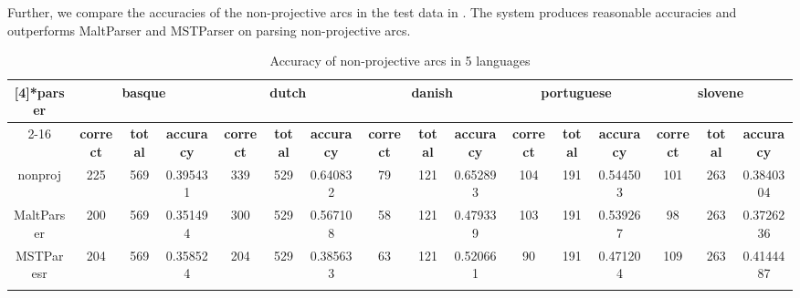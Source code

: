 Further, we compare the accuracies of the
non-projective arcs in the test data in .
The system produces reasonable accuracies and outperforms MaltParser and MSTParser on parsing non-projective arcs.

\begin{table}[th]
\tiny
  \centering
  \caption{Accuracy of non-projective arcs in 5 languages}
    \begin{tabular}{c|ccc|ccc|ccc|ccc|ccc}
    \whline
    \multirow{2}[4]{*}{\textbf{parser}} & \multicolumn{3}{c|}{\textbf{basque}} & \multicolumn{3}{c|}{\textbf{dutch}} & \multicolumn{3}{c|}{\textbf{danish}} & \multicolumn{3}{c|}{\textbf{portuguese}} & \multicolumn{3}{c}{\textbf{slovene}} \\
\cline{2-16}          & \textbf{correct} & \textbf{total} & \textbf{accuracy} & \textbf{correct} & \textbf{total} & \textbf{accuracy} & \textbf{correct} & \textbf{total} & \textbf{accuracy} & \textbf{correct} & \textbf{total} & \textbf{accuracy} & \textbf{correct} & \textbf{total} & \textbf{accuracy} \\
    \whline
    nonproj  &225 & 569   &  \textcolor[rgb]{ 1,  0,  0}{0.395431} & 339 & 529   & \textcolor[rgb]{ 1,  0,  0}{0.640832} & 79 & 121   & \textcolor[rgb]{ 1,  0,  0}{0.652893} & 104 & 191   & \textcolor[rgb]{ 1,  0,  0}{0.544503} & 101   & 263   & 0.3840304 \\
    MaltParser  & 200   & 569   & 0.351494 & 300   & 529   & 0.567108 & 58    & 121   & 0.479339 & 103   & 191   & 0.539267 & 98    & 263   & 0.3726236 \\
       MSTParesr& 204   & 569   & 0.358524 & 204   & 529   & 0.385633 & 63    & 121   & 0.520661 & 90    & 191   & 0.471204 & 109 & 263   & \textcolor[rgb]{ 1,  0,  0}{0.4144487} \\
    \whline
    \end{tabular}%
  \label{tab:nonproj}%
\end{table}%



